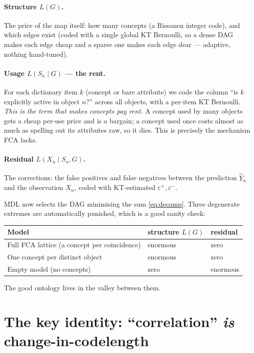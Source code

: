 \documentclass[11pt]{article}
\newcommand{\CL}{L}                       %
\newcommand{\Yhat}{\hat{Y}}
\newcommand{\epsp}{\varepsilon^{+}}
\newcommand{\epsm}{\varepsilon^{-}}
\begin{document}
\paragraph{Structure $\CL(G)$.} The price of the map itself: how many concepts
(a Rissanen integer code), and which edges exist (coded with a single global KT
Bernoulli, so a dense DAG makes each edge cheap and a sparse one makes each edge
dear --- adaptive, nothing hand-tuned).

\paragraph{Usage $\CL(S_n\mid G)$ --- the rent.} For each dictionary item
$k$ (concept or bare attribute) we code the column ``is $k$ explicitly active in
object $n$?'' across all objects, with a per-item KT Bernoulli. \emph{This is the
term that makes concepts pay rent.} A concept used by many objects gets a cheap
per-use price and is a bargain; a concept used once costs almost as much as
spelling out its attributes raw, so it dies. This is precisely the mechanism FCA
lacks.

\paragraph{Residual $\CL(X_n\mid S_n,G)$.} The corrections: the false positives
and false negatives between the prediction $\Yhat_n$ and the observation $X_n$,
coded with KT-estimated $\epsp,\epsm$.

MDL now selects the DAG minimising the sum \eqref{eq:decomp}. Three degenerate
extremes are automatically punished, which is a good sanity check:
\begin{center}
\begin{tabular}{lll}
\toprule
Model & structure $\CL(G)$ & residual \\
\midrule
Full FCA lattice (a concept per coincidence) & enormous & zero \\
One concept per distinct object & enormous & zero \\
Empty model (no concepts) & zero & enormous \\
\bottomrule
\end{tabular}
\end{center}
The good ontology lives in the valley between them.

\section{The key identity: ``correlation'' \emph{is} change-in-codelength}
\end{document}
